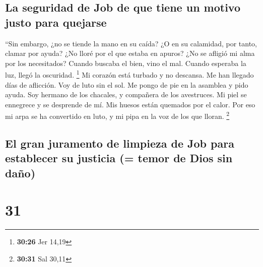 \hypertarget{la-seguridad-de-job-de-que-tiene-un-motivo-justo-para-quejarse}{%
\subsection{La seguridad de Job de que tiene un motivo justo para
quejarse}\label{la-seguridad-de-job-de-que-tiene-un-motivo-justo-para-quejarse}}

 ``Sin embargo, ¿no se tiende la mano en su caída? ¿O en
su calamidad, por tanto, clamar por ayuda?  ¿No lloré por
el que estaba en apuros? ¿No se afligió mi alma por los necesitados?
 Cuando buscaba el bien, vino el mal. Cuando esperaba la
luz, llegó la oscuridad. \footnote{\textbf{30:26} Jer 14,19}
 Mi corazón está turbado y no descansa. Me han llegado
días de aflicción.  Voy de luto sin el sol. Me pongo de
pie en la asamblea y pido ayuda.  Soy hermano de los
chacales, y compañera de los avestruces.  Mi piel se
ennegrece y se desprende de mí. Mis huesos están quemados por el calor.
 Por eso mi arpa se ha convertido en luto, y mi pipa en
la voz de los que lloran. \footnote{\textbf{30:31} Sal 30,11}

\hypertarget{el-gran-juramento-de-limpieza-de-job-para-establecer-su-justicia-temor-de-dios-sin-dauxf1o}{%
\subsection{El gran juramento de limpieza de Job para establecer su
justicia (= temor de Dios sin
daño)}\label{el-gran-juramento-de-limpieza-de-job-para-establecer-su-justicia-temor-de-dios-sin-dauxf1o}}

\hypertarget{section-30}{%
\section{31}\label{section-30}}

